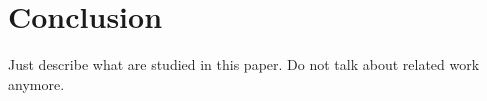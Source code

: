 \section{Conclusion}
\label{sec:conclusion}

Just describe what are studied in this paper. Do not talk about related work anymore.